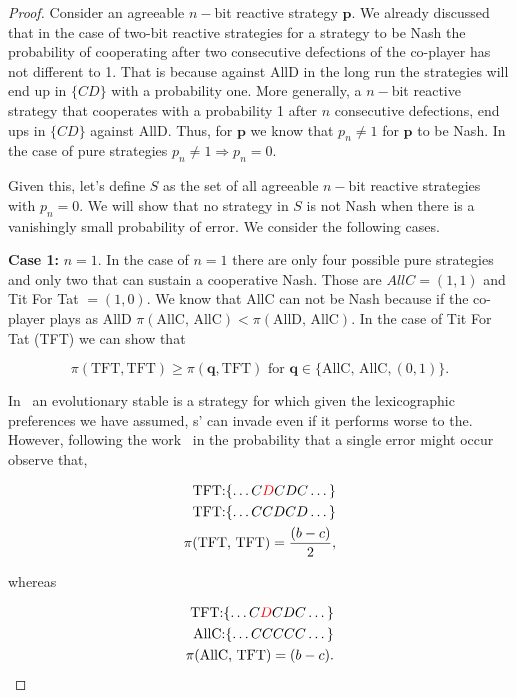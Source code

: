 \documentclass{article}
\theoremstyle{definition}
\begin{document}
\begin{proof}
Consider an agreeable \(n-\)bit reactive strategy \(\mathbf{p}\). We already
discussed that in the case of two-bit reactive strategies for a strategy to be
Nash the probability of cooperating after two consecutive defections of the
co-player has not different to 1. That is because against AllD in the long run
the strategies will end up in \(\{CD\}\) with a probability one. More generally,
a \(n-\)bit reactive strategy that cooperates with a probability 1 after \(n\)
consecutive defections, end ups in \(\{CD\}\) against AllD. Thus, for
\(\mathbf{p}\) we know that \(p_{n} \neq 1\) for \(\mathbf{p}\) to be Nash. In
the case of pure strategies \(p_{n} \neq 1 \Rightarrow p_{n} = 0\).

Given this, let's define \(S\) as the set of all agreeable \(n-\)bit reactive
strategies with \(p_{n} = 0\). We will show that no strategy in \(S\) is not
Nash when there is a vanishingly small probability of error. We consider the
following cases.

\textbf{Case 1:} \(n=1\). In the case of \(n=1\) there are only four possible
pure strategies and only two that can sustain a cooperative Nash. Those are
\(AllC = (1, 1)\) and Tit For Tat \(=(1, 0)\). We know that AllC can not be Nash
because if the co-player plays as AllD \(\pi(\text{AllC, AllC}) <
\pi(\text{AllD, AllC})\). In the case of Tit For Tat (TFT) we can show that

\[\pi(\text{TFT}, \text{TFT}) \geq \pi(\mathbf{q}, \text{TFT}) \text { for } \mathbf{q} \in \{\text{AllC, AllC}, (0, 1)\}.\]

In~\citep{fundenberg:JSTOR:1990} an evolutionary stable is a strategy for which
given the lexicographic preferences we have assumed, s' can invade even if it
performs worse to the. However, following the work~\citep{fundenberg:JSTOR:1990}
in the probability that a single error might occur observe that,

\begin{align*}
  \text{TFT:} \{\dots C \textcolor{red}{D} C D C \dots\} & \\
  \text{TFT:} \{\dots C C D C D \dots\} & \\
  \pi(\text{TFT, TFT}) = \frac{(b - c)}{2},
\end{align*}

whereas

\begin{align*}
  \text{TFT:} \{\dots C \textcolor{red}{D} C D C \dots\}\\
  \text{AllC:} \{\dots C C C C C \dots\} \\
  \pi(\text{AllC, TFT}) = (b - c).
\end{align*}


\end{proof}
\end{document}
